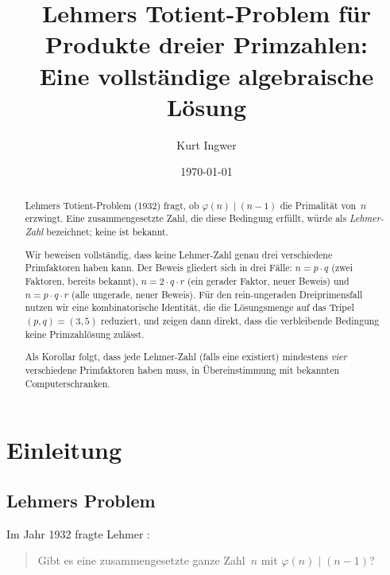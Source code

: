 \documentclass[12pt,a4paper]{amsart}
\theoremstyle{definition}
\newcommand{\euler}{\varphi}
\begin{document}

\title{Lehmers Totient-Problem für Produkte dreier Primzahlen:\\
       Eine vollständige algebraische Lösung}

\author{Kurt Ingwer}
\address{Specialist Mathematics Project, Version Build 43}
\date{\today}

\begin{abstract}
Lehmers Totient-Problem (1932) fragt, ob $\euler(n) \mid (n-1)$ die Primalität
von~$n$ erzwingt. Eine zusammengesetzte Zahl, die diese Bedingung erfüllt, würde
als \emph{Lehmer-Zahl} bezeichnet; keine ist bekannt.

Wir beweisen vollständig, dass keine Lehmer-Zahl genau drei verschiedene Primfaktoren
haben kann. Der Beweis gliedert sich in drei Fälle: $n = p \cdot q$ (zwei Faktoren,
bereits bekannt), $n = 2 \cdot q \cdot r$ (ein gerader Faktor, neuer Beweis) und
$n = p \cdot q \cdot r$ (alle ungerade, neuer Beweis). Für den rein-ungeraden
Dreiprimensfall nutzen wir eine kombinatorische Identität, die die Lösungsmenge
auf das Tripel $(p, q) = (3, 5)$ reduziert, und zeigen dann direkt, dass die
verbleibende Bedingung keine Primzahlösung zulässt.

Als Korollar folgt, dass jede Lehmer-Zahl (falls eine existiert) mindestens
\emph{vier} verschiedene Primfaktoren haben muss, in Übereinstimmung mit
bekannten Computerschranken.
\end{abstract}

\maketitle

\section{Einleitung}

\subsection{Lehmers Problem}

Im Jahr 1932 fragte Lehmer \cite{Lehmer1932}:

\begin{quote}
  Gibt es eine zusammengesetzte ganze Zahl~$n$ mit $\euler(n) \mid (n-1)$?
\end{quote}
\end{document}
